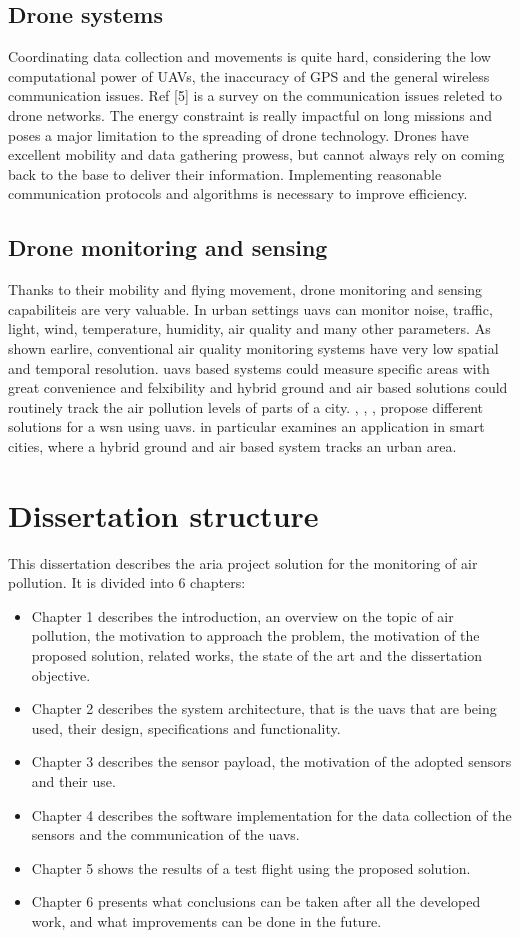 \subsection{Drone systems}
Coordinating data collection and movements is quite hard, considering the low computational power of UAVs, the inaccuracy of GPS and the general wireless communication issues. Ref [5] is a survey on the communication issues releted to drone networks. The energy constraint is really impactful on long missions and poses a major limitation to the spreading of drone technology. Drones have excellent mobility and data gathering prowess, but cannot always rely on coming back to the base to deliver their information. Implementing reasonable communication protocols and algorithms is necessary to improve efficiency. 
\subsection{Drone monitoring and sensing}
Thanks to their mobility and flying movement, drone monitoring and sensing capabiliteis are very valuable. In urban settings \gls{uavs} can monitor noise, traffic, light, wind, temperature, humidity, air quality and many other parameters.
As shown earlire, conventional air quality monitoring systems have very low spatial and temporal resolution. \gls{uavs} based systems could measure specific areas with great convenience and felxibility and hybrid ground and air based solutions could routinely track the air pollution levels of parts of a city. \cite{7946542}, \cite{evangelatos2015airborne}, \cite{8675167}, \cite{8662050} propose different solutions for a \gls{wsn} using \gls{uavs}. \cite{8675167} in particular examines an application in smart cities, where a hybrid ground and air based system tracks an urban area.
\section{Dissertation structure}
This dissertation describes the \gls{aria} project solution for the monitoring of air pollution. It is divided into 6 chapters:
\begin{itemize}
    \item Chapter 1 describes the introduction, an overview on the topic of air pollution, the motivation to approach the problem, the motivation of the proposed solution, related works, the state of the art and the dissertation objective.
    \item Chapter 2 describes the system architecture, that is the \gls{uavs} that are being used, their design, specifications and functionality.
    \item Chapter 3 describes the sensor payload, the motivation of the adopted sensors and their use.
    \item Chapter 4 describes the software implementation for the data collection of the sensors and the communication of the \gls{uavs}.
    \item Chapter 5 shows the results of a test flight using the proposed solution.
    \item Chapter 6 presents what conclusions can be taken after all the developed work, and what improvements can be done in the future.
\end{itemize}
